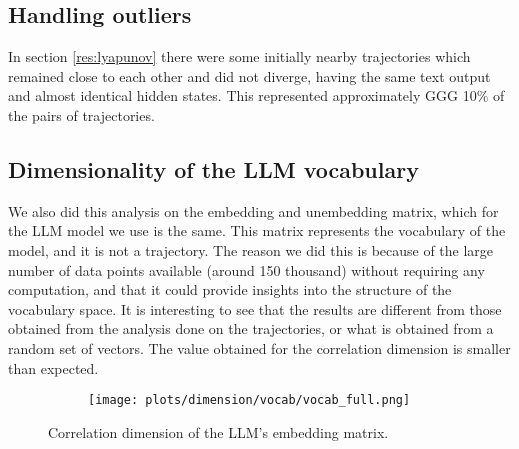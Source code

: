 \documentclass[a4paper,12pt]{article}
\begin{document}
\subsection{Handling outliers} %
\label{subsec:appendix_handling_outliers} %

In section \ref{res:lyapunov} there were some initially nearby trajectories which remained close to each other and did not diverge, having the same text output and almost identical hidden states. This represented approximately GGG 10\% of the pairs of trajectories.

\subsection{Dimensionality of the LLM vocabulary}
\label{subsec:appendix_vocab_dim}


We also did this analysis on the embedding and unembedding matrix, which for the LLM model we use is the same. This matrix represents the vocabulary of the model, and it is not a trajectory. 
The reason we did this is because of the large number of data points available (around 150 thousand) without requiring any computation, and that it could provide insights into the structure of the vocabulary space. It is interesting to see that the results are different from those obtained from the analysis done on the trajectories, or what is obtained from a random set of vectors. The value obtained for the correlation dimension is smaller than expected.

\begin{figure}[H]
    \centering
    \begin{subfigure}[b]{0.32\linewidth}
        \centering
        \texttt{[image: plots/dimension/vocab/vocab\_full.png]}
    \end{subfigure}\hfill
    \caption{Correlation dimension of the LLM's embedding matrix.}
    \label{fig:embedding_dim}
\end{figure}
\end{document}
